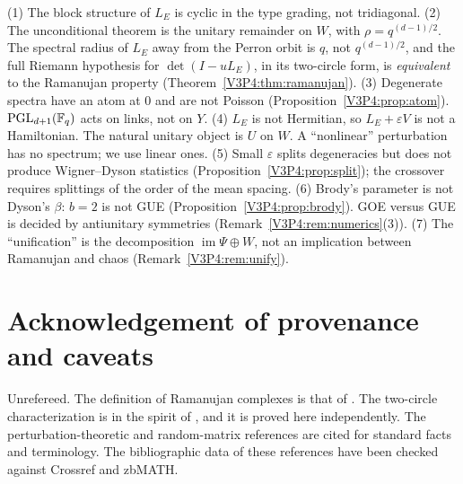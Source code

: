 \begin{remark}\label{V3P4:rem:corrections}
(1) The block structure of $L_E$ is cyclic in the type grading, not tridiagonal. (2) The
unconditional theorem is the unitary remainder on $W$, with $\rho=q^{(d-1)/2}$. The spectral
radius of $L_E$ away from the Perron orbit is $q$, not $q^{(d-1)/2}$, and the full
Riemann hypothesis for $\det(I-uL_E)$, in its two-circle form, is \emph{equivalent} to the
Ramanujan property (Theorem~\ref{V3P4:thm:ramanujan}). (3) Degenerate spectra have an atom at
$0$ and are not Poisson (Proposition~\ref{V3P4:prop:atom}). $\mathrm{PGL}_{d+1}(\mathbb{F}_q)$ acts on links,
not on $Y$. (4) $L_E$ is not Hermitian, so $L_E+\varepsilon V$ is not a Hamiltonian. The
natural unitary object is $U$ on $W$. A ``nonlinear'' perturbation has no spectrum; we use
linear ones. (5) Small $\varepsilon$ splits degeneracies but does not produce Wigner--Dyson
statistics (Proposition~\ref{V3P4:prop:split}); the crossover requires splittings of the order
of the mean spacing. (6) Brody's parameter is not Dyson's $\beta$: $b=2$ is not GUE
(Proposition~\ref{V3P4:prop:brody}). GOE versus GUE is decided by antiunitary symmetries
(Remark~\ref{V3P4:rem:numerics}(3)). (7) The ``unification'' is the decomposition
$\operatorname{im}\Psi\oplus W$, not an implication between Ramanujan and chaos
(Remark~\ref{V3P4:rem:unify}).
\end{remark}

\section*{Acknowledgement of provenance and caveats}

Unrefereed. The definition of Ramanujan complexes is that of \cite{LSV05}. The two-circle
characterization is in the spirit of \cite{KLW10}, and it is proved here independently. The
perturbation-theoretic and random-matrix references \cite{Kato,Brody73,Atas13,KS97,BGS84,JMRR99}
are cited for standard facts and terminology. The bibliographic data of these references
have been checked against Crossref and zbMATH.
